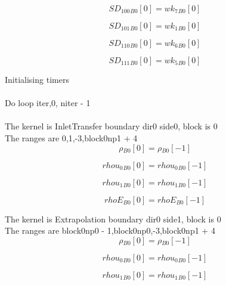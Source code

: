 \documentclass{article}
\begin{document}
\begin{dmath}{SD_{100}{_{B0}}}[{0}] = {wk_{7}{_{B0}}}[{0}]\end{dmath}

\begin{dmath}{SD_{101}{_{B0}}}[{0}] = {wk_{1}{_{B0}}}[{0}]\end{dmath}

\begin{dmath}{SD_{110}{_{B0}}}[{0}] = {wk_{6}{_{B0}}}[{0}]\end{dmath}

\begin{dmath}{SD_{111}{_{B0}}}[{0}] = {wk_{5}{_{B0}}}[{0}]\end{dmath}

\noindent Initialising timers\\
\\\noindent Do loop iter,0, niter - 1\\
\\\noindent The kernel is InletTransfer boundary dir0 side0, block is 0\\\noindent The ranges are 0,1,-3,block0np1 + 4\\\begin{dmath}{\rho{_{B0}}}[{0}] = {\rho{_{B0}}}[{-1}]\end{dmath}

\begin{dmath}{rhou_{0}{_{B0}}}[{0}] = {rhou_{0}{_{B0}}}[{-1}]\end{dmath}

\begin{dmath}{rhou_{1}{_{B0}}}[{0}] = {rhou_{1}{_{B0}}}[{-1}]\end{dmath}

\begin{dmath}{rhoE{_{B0}}}[{0}] = {rhoE{_{B0}}}[{-1}]\end{dmath}

\noindent The kernel is Extrapolation boundary dir0 side1, block is 0\\\noindent The ranges are block0np0 - 1,block0np0,-3,block0np1 + 4\\\begin{dmath}{\rho{_{B0}}}[{0}] = {\rho{_{B0}}}[{-1}]\end{dmath}

\begin{dmath}{rhou_{0}{_{B0}}}[{0}] = {rhou_{0}{_{B0}}}[{-1}]\end{dmath}

\begin{dmath}{rhou_{1}{_{B0}}}[{0}] = {rhou_{1}{_{B0}}}[{-1}]\end{dmath}
\end{document}
